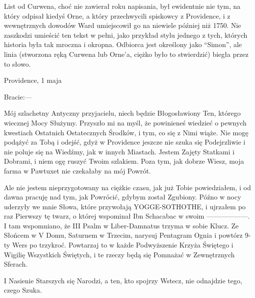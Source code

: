 List od Curwena, choć nie zawierał roku napisania, był ewidentnie nie tym, na który odpisał kiedyś Orne, a który przechwycili spiskowcy z Providence, i z wewnętrznych dowodów Ward umiejscowił go na niewiele później niż 1750. Nie zaszkodzi umieścić ten tekst w pełni, jako przykład stylu jednego z tych, których historia była tak mroczna i okropna. Odbiorca jest określony jako ``Simon'', ale linia (stworzona ręką Curwena lub Orne'a, ciężko było to stwierdzić) biegła przez to słowo.

\begin{displayquote}

\begin{flushright}
Providence, 1 maja
\end{flushright}

Bracie:—

Mój szlachetny Antyczny przyjacielu, niech będzie Błogosławiony Ten, którego wiecznej Mocy Służymy. Przyszło mi na myśl, że powinieneś wiedzieć o pewnych kwestiach Ostatnich Ostatecznych Środków, i tym, co się z Nimi wiąże. Nie mogę podążyć za Tobą i odejść, gdyż w Providence jeszcze nie szuka się Podejrzliwie i nie poluje się na Wiedźmy, jak w innych Miastach. Jestem Zajęty Statkami i Dobrami,  i niem ogę ruszyć Twoim szlakiem. Poza tym, jak dobrze Wiesz, moja farma w Pawtuxet nie czekałaby na mój Powrót.

Ale nie jestem nieprzygotowany na ciężkie czasu, jak już Tobie powiedziałem, i od dawna pracuję nad tym, jak Powrócić, gdybym został Zgubiony. Późno w nocy uderzyły we mnie Słowa, które przywołają YOGGE-SOTHOTHE, i ujrzałem po raz Pierwszy tę twarz, o której wspominał   Ibn Schacabac w swoim ——————. I tam wspomniano, że III Psalm w Liber-Damnatus trzyma w sobie Klucz. Ze Słońcem w V Domu, Saturnem w Trzecim, narysuj Pentagram Ognia i powtórz 9-ty Wers po trzykroć. Powtarzaj to w każde Podwyższenie Krzyża Świętego i Wigilię Wszystkich Świętych, i te rzeczy będą się Pomnażać w Zewnętrznych Sferach.

I Nasienie Starszych się Narodzi, a ten, kto spojrzy Wstecz, nie odnajdzie tego, czego Szuka.


\end{displayquote}

